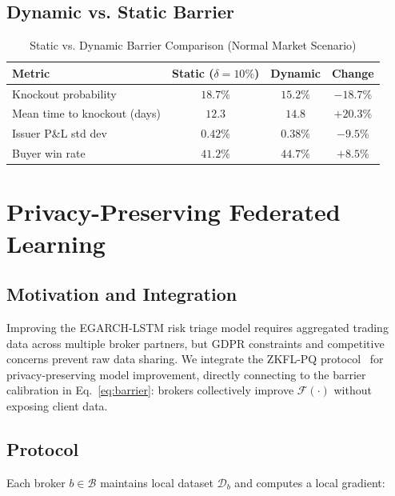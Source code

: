 \documentclass[12pt]{article}
\begin{document}
\subsection{Dynamic vs. Static Barrier}

\begin{table}[h]
\centering
\caption{Static vs. Dynamic Barrier Comparison (Normal Market Scenario)}
\begin{tabular}{lccc}
\toprule
\textbf{Metric} & \textbf{Static ($\delta=10\%$)} & \textbf{Dynamic} & \textbf{Change} \\
\midrule
Knockout probability & $18.7\%$ & $15.2\%$ & $-18.7\%$ \\
Mean time to knockout (days) & $12.3$ & $14.8$ & $+20.3\%$ \\
Issuer P\&L std dev & $0.42\%$ & $0.38\%$ & $-9.5\%$ \\
Buyer win rate & $41.2\%$ & $44.7\%$ & $+8.5\%$ \\
\bottomrule
\end{tabular}
\end{table}

\section{Privacy-Preserving Federated Learning}\label{sec:fl}

\subsection{Motivation and Integration}

Improving the EGARCH-LSTM risk triage model requires aggregated trading data across multiple
broker partners, but GDPR constraints and competitive concerns prevent raw data sharing. We
integrate the ZKFL-PQ protocol~\cite{lansiaux2026zkflpq} for privacy-preserving model
improvement, directly connecting to the barrier calibration in Eq.~\eqref{eq:barrier}: brokers
collectively improve $\mathcal{F}(\cdot)$ without exposing client data.

\subsection{Protocol}

Each broker $b \in \mathcal{B}$ maintains local dataset $\mathcal{D}_b$ and computes a
local gradient:
\end{document}
